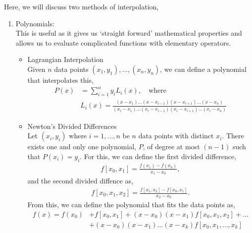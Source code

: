\documentclass[11pt,a4paper]{report}
\begin{document}
			Here, we will discuss two methods of interpolation,
			\begin{enumerate}
				\item Polynomials: \\
					This is useful as it gives us `straight forward' mathematical properties and allows us to evaluate complicated functions with elementary operators.
					\begin{itemize}
						\item Lagrangian Interpolation \\
						Given $n$ data points $(x_1,y_1),\dots,(x_n,y_n)$, we can define a polynomial that interpolates this,
						\begin{align}
							P(x) &= \sum_{i=1}^n y_i L_i(x), \quad \text{where} \\
							&L_i(x) = \frac{(x-x_1)\dots(x-x_{i-1})(x-x_{i+1})\dots (x-x_n)}{(x_i-x_1)\dots(x_i-x_{i-1})(x_i-x_{i+1})\dots (x_i-x_n)} \nonumber
						\end{align}
						\item Newton's Divided Differences \\
						Let $(x_i,y_i)$ where $i=1,\dots,n$ be $n$ data points with distinct $x_i$. There exists one and only one polynomial, $P$, of degree at most $(n-1)$ such that $P(x_i)=y_i$. For this, we can define the first divided difference,
						\begin{align}
							f[x_0,x_1] = \frac{f(x_1) - f(x_0)}{x_1-x_0},
						\end{align}
						and the second divided diffence as,
						\begin{align}
							f[x_0, x_1,x_2] = \frac{f[x_1,x_2]-f[x_0,x_1]}{x_2-x_0}.
						\end{align}
						From this, we can define the polynomial that fits the data points as,
						\begin{align}
							f(x) = f(x_0) &+ f[x_0,x_1] + (x-x_0)(x-x_1)f[x_0,x_1,x_2] + \dots \\ 
										  &+ (x-x_0)(x-x_1)\dots(x-x_k) f[x_0,x_1,\dots,x_k]
						\end{align}
						
					\end{itemize}
			\end{enumerate}
		
\end{document}
